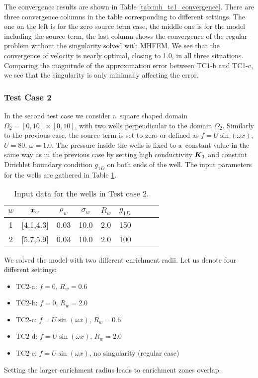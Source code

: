 The convergence results are shown in Table \ref{tab:mh_tc1_convergence}.
There are three convergence columns in the table corresponding to different settings.
The one on the left is for the zero source term case,
the middle one is for the model including the source term,
the last column shows the convergence of the regular problem without the singularity solved with MHFEM.
We see that the convergence of velocity is nearly optimal, closing to 1.0, in all three situations.
Comparing the magnitude of the approximation error between TC1-b and TC1-c,
we see that the singularity is only minimally affecting the error.


\subsubsection{Test Case 2}
In the second test case we consider a~square shaped domain $\Omega_2=[0,10]\times[0,10]$,
with two wells perpendicular to the domain $\Omega_2$.
Similarly to the previous case, the source term is set to zero or defined as $f=U\sin(\omega x)$, $U=80$, $\omega=1.0$.
The pressure inside the wells is fixed to a~constant value in the same way as in the previous case 
by setting high conductivity $\mathbf{\boldsymbol{K}}_1$ and constant Dirichlet boundary condition $g_{1D}$ on both ends of the well.
The input parameters for the wells are gathered in Table \ref{tab:tc2_data}.
%
\begin{table}[!hb]
\begin{center}
\begin{tabular}{ccccccccc}
\toprule
$w$ & $\mathbf{\boldsymbol{x}}_w$  & $\rho_w$ & $\sigma_w$ & $R_w$ & $g_{1D}$\\
\midrule
1& [4.1,4.3] & 0.03 & 10.0 & 2.0 & 150 \\
2& [5.7,5.9] & 0.03 & 10.0 & 2.0 & 100 \\
\bottomrule
\end{tabular}
\caption{Input data for the wells in Test case 2.}
\label{tab:tc2_data}
\end{center}
\end{table}

We solved the model with two different enrichment radii. Let us denote four different settings:
\begin{itemize}
    \item TC2-a: $f=0$, $R_w=0.6$
    \item TC2-b: $f=0$, $R_w=2.0$
    \item TC2-c: $f=U\sin(\omega x)$, $R_w=0.6$
    \item TC2-d: $f=U\sin(\omega x)$, $R_w=2.0$
    \item TC2-e: $f=U\sin(\omega x)$, no singularity (regular case)
\end{itemize}
Setting the larger enrichment radius leads to enrichment zones overlap.

